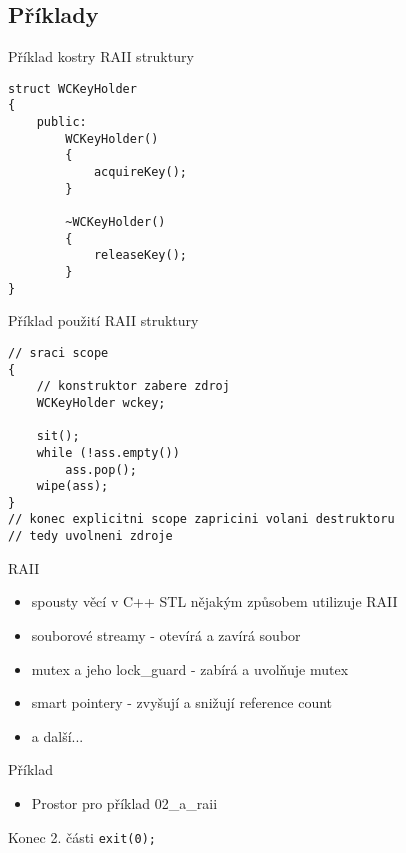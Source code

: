 \documentclass{beamer}
\begin{document}
\subsection{Příklady}

\begin{xframe}{Příklad kostry RAII struktury}

\begin{lstlisting}[basicstyle=\fontsize{8}{9}\selectfont\ttfamily]
struct WCKeyHolder
{
    public:
        WCKeyHolder()
        {
            acquireKey();
        }

        ~WCKeyHolder()
        {
            releaseKey();
        }
}
\end{lstlisting}

\end{xframe}

\begin{xframe}{Příklad použití RAII struktury}

\begin{lstlisting}[basicstyle=\fontsize{8}{9}\selectfont\ttfamily]
// sraci scope
{
    // konstruktor zabere zdroj
    WCKeyHolder wckey;
    
    sit();
    while (!ass.empty())
        ass.pop();
    wipe(ass);
}
// konec explicitni scope zapricini volani destruktoru
// tedy uvolneni zdroje
\end{lstlisting}

\end{xframe}

\begin{xframe}{RAII}
	\begin{itemize}
		\item spousty věcí v C++ STL nějakým způsobem utilizuje RAII
		\item souborové streamy - otevírá a zavírá soubor
		\item mutex a jeho lock\_guard - zabírá a uvolňuje mutex
		\item smart pointery - zvyšují a snižují reference count
		\item a další...
	\end{itemize}
\end{xframe}

\begin{xframe}{Příklad}
	\begin{itemize}
		\item Prostor pro příklad 02\_a\_raii
	\end{itemize}
\end{xframe}




\begin{xframe}{Konec 2. části}
\texttt{exit(0);}
\end{xframe}
\end{document}
